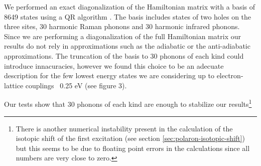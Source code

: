 
We performed an exact diagonalization of the Hamiltonian matrix with a basis of 8649 states using a QR algorithm \cite{eigenweb}. 
The basis includes states of two holes on the three sites, 30 harmonic Raman phonons and 30 harmonic infrared phonons. 
Since we are performing a diagonalization of the full Hamiltonian matrix our results do not rely in approximations such as the adiabatic or the anti-adiabatic approximations. 
The  truncation of the basis to 30 phonons of each kind could introduce innacuracies, however we found this choice to be an adecuate description for the few lowest energy states we are considering up to electron-lattice couplings ~0.25 eV (see figure 3).

Our tests show that 30 phonons of each kind are enough to stabilize our results\footnote{There is another numerical instability present in the calculation of the isotopic shift of the first excitation (see section \ref{sec:polaron-isotopic-shift}) but this seems to be due to floating point errors in the calculations since all numbers are very close to zero.}
